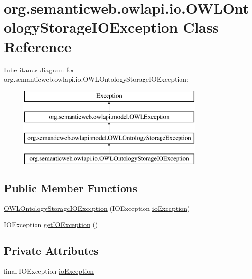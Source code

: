 \hypertarget{classorg_1_1semanticweb_1_1owlapi_1_1io_1_1_o_w_l_ontology_storage_i_o_exception}{\section{org.\-semanticweb.\-owlapi.\-io.\-O\-W\-L\-Ontology\-Storage\-I\-O\-Exception Class Reference}
\label{classorg_1_1semanticweb_1_1owlapi_1_1io_1_1_o_w_l_ontology_storage_i_o_exception}
}
Inheritance diagram for org.\-semanticweb.\-owlapi.\-io.\-O\-W\-L\-Ontology\-Storage\-I\-O\-Exception\-:\begin{figure}[H]
\begin{center}
\leavevmode
\includegraphics[height=4.000000cm]{classorg_1_1semanticweb_1_1owlapi_1_1io_1_1_o_w_l_ontology_storage_i_o_exception}
\end{center}
\end{figure}
\subsection*{Public Member Functions}
\begin{DoxyCompactItemize}
\item 
\hyperlink{classorg_1_1semanticweb_1_1owlapi_1_1io_1_1_o_w_l_ontology_storage_i_o_exception_a8e2dacfc0261a770329994aac97e6974}{O\-W\-L\-Ontology\-Storage\-I\-O\-Exception} (I\-O\-Exception \hyperlink{classorg_1_1semanticweb_1_1owlapi_1_1io_1_1_o_w_l_ontology_storage_i_o_exception_a831b6f6f52574fe776e512d2a59206b2}{io\-Exception})
\item 
I\-O\-Exception \hyperlink{classorg_1_1semanticweb_1_1owlapi_1_1io_1_1_o_w_l_ontology_storage_i_o_exception_aa3bc98769b1641744cd0c91fc3bd2d75}{get\-I\-O\-Exception} ()
\end{DoxyCompactItemize}
\subsection*{Private Attributes}
\begin{DoxyCompactItemize}
\item 
final I\-O\-Exception \hyperlink{classorg_1_1semanticweb_1_1owlapi_1_1io_1_1_o_w_l_ontology_storage_i_o_exception_a831b6f6f52574fe776e512d2a59206b2}{io\-Exception}
\end{DoxyCompactItemize}
